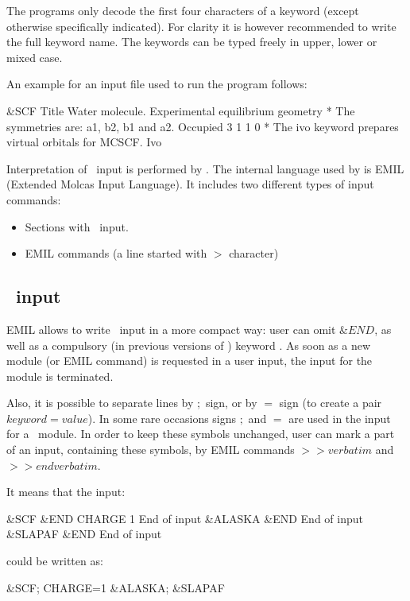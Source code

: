 The programs only decode the first four characters of a keyword
(except otherwise specifically indicated). For clarity it is however
recommended to write the full keyword name. The keywords can be typed freely
in upper, lower or mixed case.

An example for an input file used to run the  program follows:

\begin{inputlisting}
 &SCF
Title
 Water molecule. Experimental equilibrium geometry
* The symmetries are: a1, b2, b1 and a2.
Occupied
3 1 1 0
* The ivo keyword prepares virtual orbitals for MCSCF.
Ivo
\end{inputlisting}

Interpretation of \molcas\ input is performed by .
The internal language used by  is EMIL (Extended Molcas Input
Language).
It includes two different types of input commands:
\begin{itemize}
\item Sections with \molcas\ input.
\item EMIL commands (a line started with $>$ character)
\end{itemize}

\subsection{\molcas\ input}

EMIL allows to write \molcas\ input in a more compact way:
user can omit $\&END$, as well as a compulsory (in previous versions of \molcas) keyword .
As soon as a new module (or EMIL command) is requested in
a user input, the input for the module is terminated.

Also, it is possible to separate lines by $;$ sign, or by $=$ sign (to create
a pair $keyword=value$). In some rare occasions signs $;$ and $=$ are used in
the input for a \molcas\ module. In order to keep these symbols unchanged, user can
mark a part of an input, containing these symbols, by EMIL commands $>> verbatim$ and
$>> end verbatim$.

It means that the input:
\begin{sourcelisting}
 &SCF &END
CHARGE
 1
End of input
 &ALASKA &END
End of input
 &SLAPAF &END
End of input
\end{sourcelisting}

could be written as:
\begin{sourcelisting}
 &SCF; CHARGE=1
 &ALASKA;  &SLAPAF
\end{sourcelisting}

